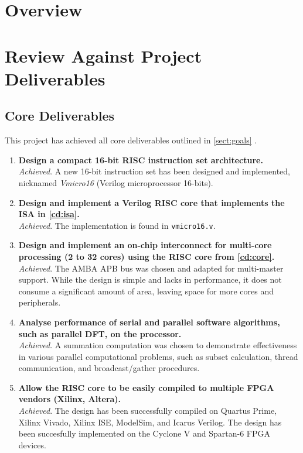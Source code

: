 \section{Overview}

\section{Review Against Project Deliverables}
\subsection{Core Deliverables}
This project has achieved all core deliverables outlined in \cref{sect:goals} .

\begin{enumerate}[leftmargin=2\parindent, label=\bfseries CD\arabic*]
\item{\textbf{Design a compact 16-bit RISC instruction set architecture.}\\
\textit{Achieved}. A new 16-bit instruction set has been designed and implemented, nicknamed \textit{Vmicro16} (Verilog microprocessor 16-bits).
}

\item{\textbf{Design and implement a Verilog RISC core that implements the ISA in \ref{cd:isa}.}\\
\textit{Achieved}. The implementation is found in \verb|vmicro16.v|.
}

\item{\textbf{Design and implement an on-chip interconnect for multi-core processing (2 to 32 cores) using the RISC core from \ref{cd:core}.}\\
\textit{Achieved}. The AMBA APB bus was chosen and adapted for multi-master support. While the design is simple and lacks in performance, it does not consume a significant amount of area, leaving space for more cores and peripherals.
}

\item{\textbf{Analyse performance of serial and parallel software algorithms, such as parallel DFT, on the processor.}\\
\textit{Achieved}. A summation computation was chosen to demonstrate effectiveness in various parallel computational problems, such as subset calculation, thread communication, and broadcast/gather procedures.
}

\item{\textbf{Allow the RISC core to be easily compiled to multiple FPGA vendors (Xilinx, Altera).}\\
\textit{Achieved}. The design has been successfully compiled on Quartus Prime, Xilinx Vivado, Xilinx ISE, ModelSim, and Icarus Verilog. The design has been succesfully implemented on the Cyclone V and Spartan-6 FPGA devices.
}
\end{enumerate}

